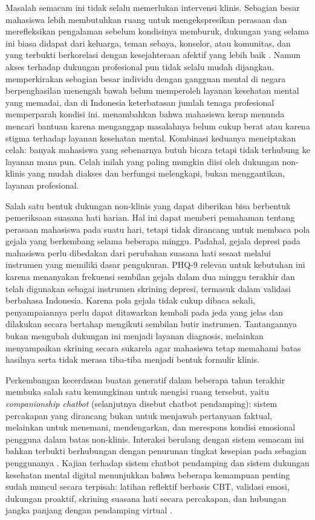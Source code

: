 Masalah semacam ini tidak selalu memerlukan intervensi klinis. Sebagian besar mahasiswa lebih membutuhkan ruang untuk mengekspresikan perasaan dan merefleksikan pengalaman sebelum kondisinya memburuk, dukungan yang selama ini biasa didapat dari keluarga, teman sebaya, konselor, atau komunitas, dan yang terbukti berkorelasi dengan kesejahteraan afektif yang lebih baik \parencite{pinho2020}. Namun akses terhadap dukungan profesional pun tidak selalu mudah dijangkau. \textcite{who2022} memperkirakan sebagian besar individu dengan gangguan mental di negara berpenghasilan menengah bawah belum memperoleh layanan kesehatan mental yang memadai, dan di Indonesia keterbatasan jumlah tenaga profesional memperparah kondisi ini. \textcite{eisenberg2021} menambahkan bahwa mahasiswa kerap menunda mencari bantuan karena menganggap masalahnya belum cukup berat atau karena stigma terhadap layanan kesehatan mental. Kombinasi keduanya menciptakan celah: banyak mahasiswa yang sebenarnya butuh bicara tetapi tidak terhubung ke layanan mana pun. Celah inilah yang paling mungkin diisi oleh dukungan non-klinis yang mudah diakses dan berfungsi melengkapi, bukan menggantikan, layanan profesional.

Salah satu bentuk dukungan non-klinis yang dapat diberikan bisa berbentuk pemeriksaan suasana hati harian. Hal ini dapat memberi pemahaman tentang perasaan mahasiswa pada suatu hari, tetapi tidak dirancang untuk membaca pola gejala yang berkembang selama beberapa minggu. Padahal, gejala depresi pada mahasiswa perlu dibedakan dari perubahan suasana hati sesaat melalui instrumen yang memiliki dasar pengukuran. PHQ-9 relevan untuk kebutuhan ini karena menanyakan frekuensi sembilan gejala dalam dua minggu terakhir dan telah digunakan sebagai instrumen skrining depresi, termasuk dalam validasi berbahasa Indonesia. Karena pola gejala tidak cukup dibaca sekali, penyampaiannya perlu dapat ditawarkan kembali pada jeda yang jelas dan dilakukan secara bertahap mengikuti sembilan butir instrumen. Tantangannya bukan mengubah dukungan ini menjadi layanan diagnosis, melainkan menyampaikan skrining secara sukarela agar mahasiswa tetap memahami batas hasilnya serta tidak merasa tiba-tiba menjadi bentuk formulir klinis.

Perkembangan kecerdasan buatan generatif dalam beberapa tahun terakhir membuka salah satu kemungkinan untuk mengisi ruang tersebut, yaitu \textit{companionship chatbot} (selanjutnya disebut chatbot pendamping): sistem percakapan yang dirancang bukan untuk menjawab pertanyaan faktual, melainkan untuk menemani, mendengarkan, dan merespons kondisi emosional pengguna dalam batas non-klinis. Interaksi berulang dengan sistem semacam ini bahkan terbukti berhubungan dengan penurunan tingkat kesepian pada sebagian penggunanya \parencite{defreitasLoneliness2024}. Kajian terhadap sistem chatbot pendamping dan sistem dukungan kesehatan mental digital menunjukkan bahwa beberapa kemampuan penting sudah muncul secara terpisah: latihan reflektif berbasis CBT, validasi emosi, dukungan proaktif, skrining suasana hati secara percakapan, dan hubungan jangka panjang dengan pendamping virtual \parencite{fitzpatrick2017,inkster2018,fulmer2018,guo2025,skjuve2021,maples2024}.

